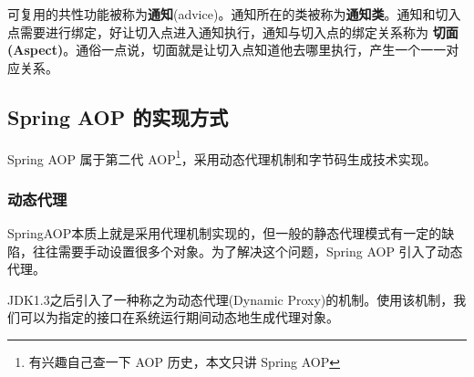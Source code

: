 可复用的共性功能被称为\textbf{通知}(advice)。通知所在的类被称为\textbf{通知类}。通知和切入点需要进行绑定，好让切入点进入通知执行，通知与切入点的绑定关系称为 \textbf{切面(Aspect)}。通俗一点说，切面就是让切入点知道他去哪里执行，产生一个一一对应关系。

\subsection{Spring AOP 的实现方式}

Spring AOP 属于第二代 AOP\footnote{有兴趣自己查一下 AOP 历史，本文只讲 Spring AOP}，采用动态代理机制和字节码生成技术实现。

\subsubsection{动态代理}

SpringAOP本质上就是采用代理机制实现的，但一般的静态代理模式有一定的缺陷，往往需要手动设置很多个对象。为了解决这个问题，Spring AOP 引入了动态代理。

JDK1.3之后引入了一种称之为动态代理(Dynamic Proxy)的机制。使用该机制，我们可以为指定的接口在系统运行期间动态地生成代理对象。